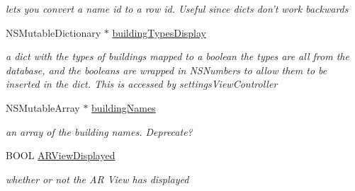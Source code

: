 \begin{DoxyCompactItemize}
\begin{DoxyCompactList}\small\item\em lets you convert a name id to a row id. Useful since dicts don't work backwards \end{DoxyCompactList}\item 
\hypertarget{interface_virt_tour_view_controller_aefcd90476e5b99300fc28598ae858be1}{N\-S\-Mutable\-Dictionary $\ast$ \hyperlink{interface_virt_tour_view_controller_aefcd90476e5b99300fc28598ae858be1}{building\-Types\-Display}}\label{interface_virt_tour_view_controller_aefcd90476e5b99300fc28598ae858be1}

\begin{DoxyCompactList}\small\item\em a dict with the types of buildings mapped to a boolean  the types are all from the database, and the booleans are wrapped in N\-S\-Numbers to allow them to be inserted in the dict. This is accessed by settings\-View\-Controller \end{DoxyCompactList}\item 
\hypertarget{interface_virt_tour_view_controller_a3d45bf4e9fd3a874e5f4a32d52024df4}{N\-S\-Mutable\-Array $\ast$ \hyperlink{interface_virt_tour_view_controller_a3d45bf4e9fd3a874e5f4a32d52024df4}{building\-Names}}\label{interface_virt_tour_view_controller_a3d45bf4e9fd3a874e5f4a32d52024df4}

\begin{DoxyCompactList}\small\item\em an array of the building names. Deprecate? \end{DoxyCompactList}\item 
\hypertarget{interface_virt_tour_view_controller_a6c9fdfddaf711a7fb5dea897beb27b76}{B\-O\-O\-L \hyperlink{interface_virt_tour_view_controller_a6c9fdfddaf711a7fb5dea897beb27b76}{A\-R\-View\-Displayed}}\label{interface_virt_tour_view_controller_a6c9fdfddaf711a7fb5dea897beb27b76}

\begin{DoxyCompactList}\small\item\em whether or not the A\-R View has displayed \end{DoxyCompactList}\end{DoxyCompactItemize}


